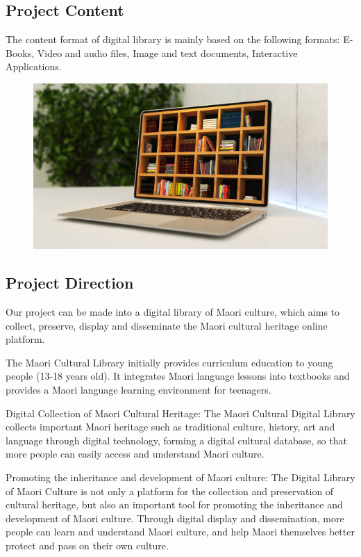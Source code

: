 \subsection{Project Content}
The content format of digital library is mainly based on the following formats:
E-Books, Video and audio files, Image and text documents, Interactive Applications.

\begin{figure}[htbp]
  \centerline{\includegraphics[width=500pt]{images/1-2-1.jpg}}
\end{figure}

\subsection{Project Direction}
Our project can be made into a digital library of Maori culture, which aims to collect, preserve, display and disseminate the Maori cultural heritage online platform.

The Maori Cultural Library initially provides curriculum education to young people (13-18 years old). It integrates Maori language lessons into textbooks and provides a Maori language learning environment for teenagers.

Digital Collection of Maori Cultural Heritage: The Maori Cultural Digital Library collects important Maori heritage such as traditional culture, history, art and language through digital technology, forming a digital cultural database, so that more people can easily access and understand Maori culture.

Promoting the inheritance and development of Maori culture: The Digital Library of Maori Culture is not only a platform for the collection and preservation of cultural heritage, but also an important tool for promoting the inheritance and development of Maori culture. Through digital display and dissemination, more people can learn and understand Maori culture, and help Maori themselves better protect and pass on their own culture.

